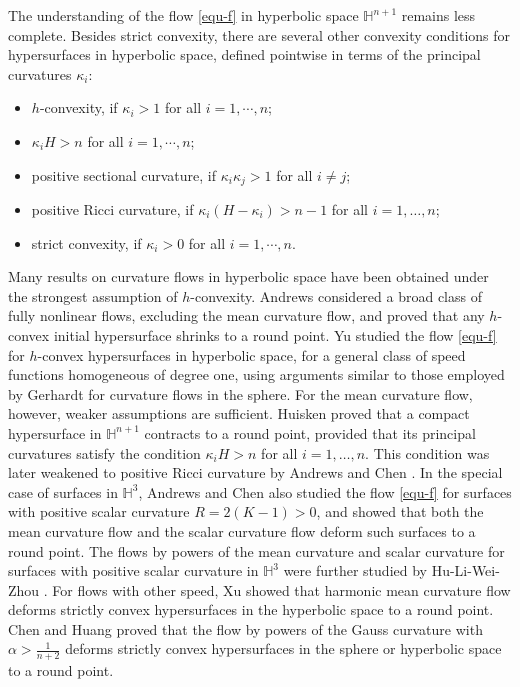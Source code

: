 \documentclass[11pt,reqno]{amsart}
\theoremstyle{remark}
\numberwithin{equation}{section}
\begin{document}
The understanding of the flow \eqref{equ-f} in hyperbolic space $\mathbb{H}^{n+1}$ remains less complete. Besides strict convexity, there are several other convexity conditions for hypersurfaces in hyperbolic space, defined pointwise in terms of the principal curvatures $\kappa_i$:
\begin{itemize}
\item $h$-convexity, if $\kappa_i>1$ for all $i=1,\cdots,n$;
\item $\kappa_iH>n$ for all $i=1,\cdots,n$;
\item positive sectional curvature, if $\kappa_i\kappa_j>1$ for all $i\neq j$;
\item positive Ricci curvature, if $\kappa_i(H-\kappa_i)>n-1$ for all $i=1,\dots,n$;
\item strict convexity, if $\kappa_i>0$ for all $i=1,\cdots,n$.
\end{itemize}
Many results on curvature flows in hyperbolic space have been obtained under the strongest assumption of $h$-convexity. Andrews \cite{And9402} considered a broad class of fully nonlinear flows, excluding the mean curvature flow, and proved that any $h$-convex initial hypersurface shrinks to a round point. Yu \cite{Yu16} studied the flow \eqref{equ-f} for $h$-convex hypersurfaces in hyperbolic space, for a general class of speed functions homogeneous of degree one, using arguments similar to those employed by Gerhardt \cite{Ger15} for curvature flows in the sphere. For the mean curvature flow, however, weaker assumptions are sufficient. Huisken \cite{Hui8602} proved that a compact hypersurface in $\mathbb{H}^{n+1}$ contracts to a round point, provided that its principal curvatures satisfy the condition $\kappa_iH>n$ for all $i=1,\dots,n$. This condition was later weakened to positive Ricci curvature by Andrews and Chen \cite{AC17}. In the special case of surfaces in $\mathbb{H}^3$, Andrews and Chen \cite{AC17} also studied the flow \eqref{equ-f} for surfaces with positive scalar curvature $R=2(K-1)>0$, and showed that both the mean curvature flow and the scalar curvature flow deform such surfaces to a round point. The flows by powers of the mean curvature and scalar curvature for surfaces with positive scalar curvature in $\mathbb{H}^3$ were further studied by Hu-Li-Wei-Zhou \cite{HLWZ20}. For flows with other speed, Xu \cite{xu10} showed that harmonic mean curvature flow deforms strictly convex hypersurfaces in the hyperbolic  space to a round point.  Chen and Huang \cite{CH24}  proved that the flow by powers of the Gauss curvature with $\alpha>\frac{1}{n+2}$ deforms strictly convex hypersurfaces in the sphere or hyperbolic space to a round point.
\end{document}
